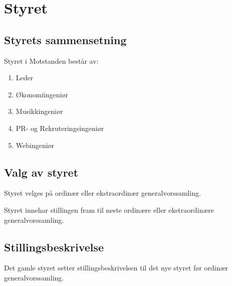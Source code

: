 \section{Styret}
    \subsection{Styrets sammensetning}
        \begin{statute}
            Styret i Motstanden består av:
            \begin{enumerate}[font = \bfseries]
                \item Leder
                \item Økonomiingeniør
                \item Musikkingeniør
                \item PR- og Rekruteringsingeniør
                \item Webingeniør
            \end{enumerate}
        \end{statute}

    \subsection{Valg av styret}
        \begin{statute}
            Styret velges på ordinær eller ekstraordinær generalvorssamling.
        \end{statute}
        \begin{statute}
            Styret innehar stillingen fram til neste ordinære eller ekstraordinære generalvorssamling.
        \end{statute}
        
    \subsection{Stillingsbeskrivelse}
        \begin{statute}
            Det gamle styret setter stillingsbeskrivelsen til det nye styret før ordinær generalvorssamling.
        \end{statute}
      